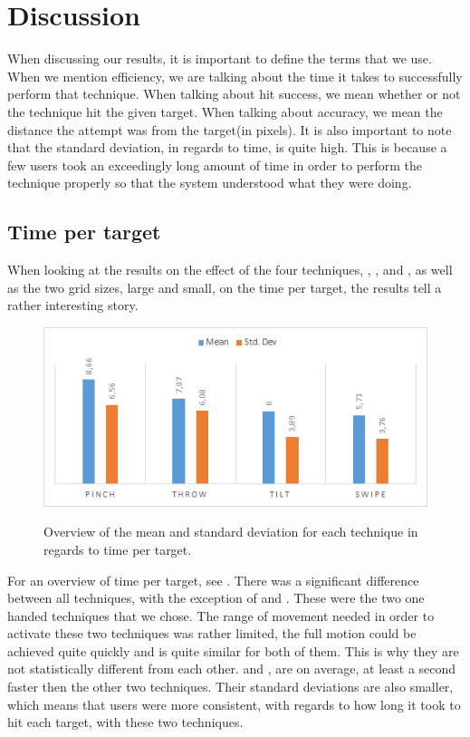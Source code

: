 \section{Discussion}
\label{sec:discussion}
When discussing our results, it is important to define the terms that we use.
When we mention efficiency, we are talking about the time it takes to successfully perform that technique.
When talking about hit success, we mean whether or not the technique hit the given target.
When talking about accuracy, we mean the distance the attempt was from the target(in pixels).
It is also important to note that the standard deviation, in regards to time, is quite high.
This is because a few users took an exceedingly long amount of time in order to perform the technique properly so that the system understood what they were doing.
\subsection{Time per target}
When looking at the results on the effect of the four techniques, \pinch, \tilt, \swipe and \throw, as well as the two grid sizes, large and small, on the time per target, the results tell a rather interesting story. 

\begin{figure}[H]
	{\includegraphics[width = 1\columnwidth ]{images/timeResults.png}} 
	\caption{
		Overview of the mean and standard deviation for each technique in regards to time per target.
	}
	\label{fig:timeResults}
\end{figure}

For an overview of time per target, see .
There was a significant difference between all techniques, with the exception of \swipe and \tilt. These were the two one handed techniques that we chose. The range of movement needed in order to activate these two techniques was rather limited, the full motion could be achieved quite quickly and is quite similar for both of them. 
This is why they are not statistically different from each other. \swipe and \tilt, are on average, at least a second faster then the other two techniques.
Their standard deviations are also smaller, which means that users were more consistent, with regards to how long it took to hit each target, with these two techniques. 


